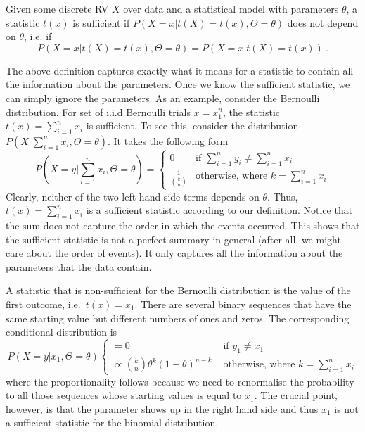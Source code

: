 \begin{Definition}\label{def:discreteSuffStat}
Given some discrete RV $ X $ over data and a statistical model with parameters $ \theta $, 
a statistic $ t(x) $ is sufficient if $ P(X=x|t(X) = t(x), \Theta = \theta) $ does not depend on $ \theta $,
i.e. if 
$$ P(X=x|t(X) = t(x), \Theta = \theta) = P(X=x|t(X) = t(x)) \ . $$
\end{Definition}

The above definition captures exactly what it means for a statistic to contain all the information
about the parameters. Once we know the sufficient statistic, we can simply ignore the parameters. As an
example, consider the Bernoulli distribution. For set of i.i.d Bernoulli trials $ x=x_{1}^{n} $,
the statistic $ t(x) = \sum_{i=1}^{n} x_{i} $ is sufficient. To see this, consider the distribution
$ P(X|\sum_{i=1}^{n} x_{i}, \Theta = \theta) $. It takes the following form
\begin{equation*}
P\left( X=y|\sum_{i=1}^{n} x_{i}, \Theta = \theta \right) = 
\begin{cases}
0 & \mbox{if } \sum_{i=1}^{n} y_{i} \not = \sum_{i=1}^{n} x_{i} \\
\frac{1}{\binom{k}{n}} & \mbox{otherwise, where } k = \sum_{i=1}^{n} x_{i}
\end{cases}
\end{equation*}
Clearly, neither of the two left-hand-side terms depends on $ \theta $. Thus, $ t(x) = \sum_{i=1}^{n} x_{i} $
is a sufficient statistic according to our definition. Notice that the sum does not capture the
order in which the events occurred. This shows that the sufficient statistic is not a perfect summary
in general (after all, we might care about the order of events). It only captures all the information
about the parameters that the data contain.

A statistic that is non-sufficient for the Bernoulli distribution is the value of the first outcome, i.e.\ 
$ t(x) = x_{1} $. There are several binary sequences that have the same starting value but
different numbers of ones and zeros. The corresponding conditional distribution is
\begin{equation*}
P(X=y|x_{1}, \Theta = \theta)
\begin{cases}
= 0 & \mbox{ if } y_{1} \not = x_{1} \\
\propto \binom{k}{n} \theta^{k} (1 - \theta)^{n-k} & \mbox{ otherwise, where } k = \sum_{i=1}^{n} x_{i}
\end{cases}
\end{equation*}
where the proportionality follows because we need to renormalise the probability to all those
sequences whose starting values is equal to $ x_{1} $. The crucial point, however, is that the parameter
shows up in the right hand side and thus $ x_{1} $ is not a sufficient statistic for the binomial
distribution.

